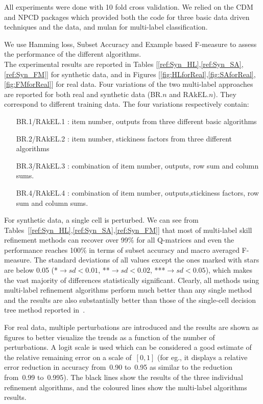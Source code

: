 \documentclass[runningheads,a4paper]{llncs}
\begin{document}
All experiments were done with 10 fold cross validation. 
We relied on the CDM \cite{CDM} and NPCD packages which provided both the code for three basic data driven techniques and the data, and mulan \cite{Tsoumakas2010MLD} for multi-label classification.

  We use Hamming loss, Subset Accuracy and Example based F-measure to assess the performance of the different algorithms.\\


 The experimental results are reported in Tables [\ref{ref:Syn_HL},\ref{ref:Syn_SA},\ref{ref:Syn_FM}] for synthetic data, and in  Figures [\ref{fig:HLforReal},\ref{fig:SAforReal},\ref{fig:FMforReal}] for real data. Four variations of the two multi-label approaches are reported for both real and synthetic data (BR.$n$ and RAkEL.$n$).  They correspond to different training data.  The four variations respectively contain:

\begin{itemize}   
	\item[BR.1/RAkEL.1]: item number, outputs from three different basic algorithms
	\item[BR.2/RAkEL.2]: item number, stickiness factors from three different algorithms	  
	\item[BR.3/RAkEL.3]: combination of item number, outputs, row sum and column sums.	  
	\item[BR.4/RAkEL.4]: combination of item number, outputs,stickiness factors, row sum and column sums.	  
\end{itemize}

For synthetic data, a single cell is perturbed. We can see from Tables~[\ref{ref:Syn_HL},\ref{ref:Syn_SA},\ref{ref:Syn_FM}] that most of multi-label skill refinement methods can recover over 99\% for all Q-matrices and even the performance reaches 100\% in terms of subset accuracy and macro averaged F-measure.  The standard deviations of all values except the ones marked with stars are below 0.05 (*$\rightarrow sd<0.01$, **$\rightarrow sd<0.02$, ***$\rightarrow sd<0.05$), which makes the vast majority of differences statistically significant. Clearly, all methods using multi-label refinement algorithms perform much better than any single method and the results are also substantially better than those of the single-cell decision tree method reported in~\cite{desmarais2015combining}.

For real data, multiple perturbations are introduced and the results are shown as figures to better visualize the trends as a function of the number of perturbations.   A logit scale is used which can be considered a good estimate of the relative remaining error on a scale of~$[0,1]$ (for eg., it displays a relative error reduction in accuracy from~0.90 to~0.95 as similar to the reduction from~0.99 to~0.995). The black lines show the results of the three individual refinement algorithms, and the coloured lines show the multi-label algorithms results.  
\end{document}
